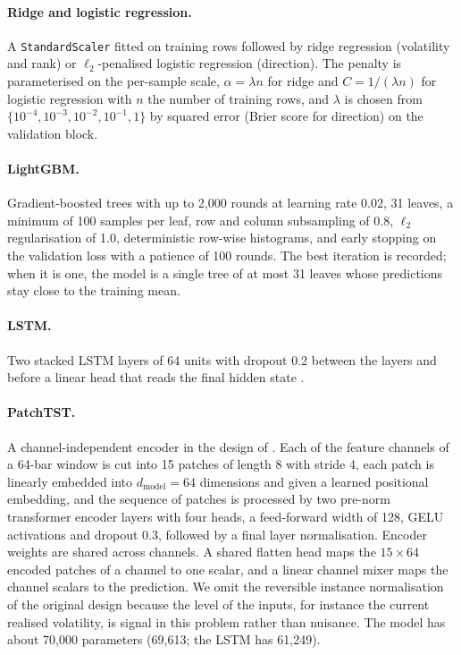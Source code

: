 \documentclass[10pt,a4paper,twoside,twocolumn]{article}
\begin{document}
\paragraph{Ridge and logistic regression.} A \texttt{StandardScaler} fitted on training rows followed by ridge regression (volatility and rank) or $\ell_2$-penalised logistic regression (direction). The penalty is parameterised on the per-sample scale, $\alpha=\lambda n$ for ridge and $C=1/(\lambda n)$ for logistic regression with $n$ the number of training rows, and $\lambda$ is chosen from $\{10^{-4},10^{-3},10^{-2},10^{-1},1\}$ by squared error (Brier score for direction) on the validation block.

\paragraph{LightGBM.} Gradient-boosted trees \citep{ke2017lightgbm} with up to 2{,}000 rounds at learning rate 0.02, 31 leaves, a minimum of 100 samples per leaf, row and column subsampling of 0.8, $\ell_2$ regularisation of 1.0, deterministic row-wise histograms, and early stopping on the validation loss with a patience of 100 rounds. The best iteration is recorded; when it is one, the model is a single tree of at most 31 leaves whose predictions stay close to the training mean.

\paragraph{LSTM.} Two stacked LSTM layers of 64 units with dropout 0.2 between the layers and before a linear head that reads the final hidden state \citep{hochreiter1997lstm}.

\paragraph{PatchTST.} A channel-independent encoder in the design of \citet{nie2023patchtst}. Each of the \metanfeatures{} feature channels of a 64-bar window is cut into 15 patches of length 8 with stride 4, each patch is linearly embedded into $d_{\text{model}}=64$ dimensions and given a learned positional embedding, and the sequence of patches is processed by two pre-norm transformer encoder layers with four heads, a feed-forward width of 128, GELU activations and dropout 0.3, followed by a final layer normalisation. Encoder weights are shared across channels. A shared flatten head maps the $15\times 64$ encoded patches of a channel to one scalar, and a linear channel mixer maps the \metanfeatures{} channel scalars to the prediction. We omit the reversible instance normalisation of the original design because the level of the inputs, for instance the current realised volatility, is signal in this problem rather than nuisance. The model has about 70{,}000 parameters (69{,}613; the LSTM has 61{,}249).
\end{document}
